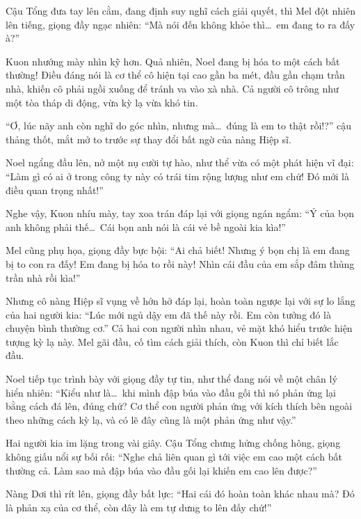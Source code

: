 \documentclass[../main.tex]{subfiles}
\begin{document}
Cậu Tổng đưa tay lên cằm, đang định suy nghĩ cách giải quyết, thì Mel đột nhiên lên tiếng, giọng đầy ngạc nhiên: ``Mà nói đến không khỏe thì\dots\ em đang to ra đấy à?''

Kuon nhướng mày nhìn kỹ hơn. Quả nhiên, Noel đang bị hóa to một cách bất thường! Điều đáng nói là cơ thể cô hiện tại cao gần ba mét, đầu gần chạm trần nhà, khiến cô phải ngồi xuống để tránh va vào xà nhà. Cả người cô trông như một tòa tháp di động, vừa kỳ lạ vừa khó tin.


``Ơ, lúc nãy anh còn nghĩ do góc nhìn, nhưng mà\dots\ đúng là em to thật rồi!?'' cậu thảng thốt, mắt mở to trước sự thay đổi bất ngờ của nàng Hiệp sĩ.

Noel ngẩng đầu lên, nở một nụ cười tự hào, như thể vừa có một phát hiện vĩ đại: ``Làm gì có ai ở trong công ty này có trái tim rộng lượng như em chứ! Đó mới là điều quan trọng nhất!''

Nghe vậy, Kuon nhíu mày, tay xoa trán đáp lại với giọng ngán ngẩm: ``Ý của bọn anh không phải thế\dots\ Cái bọn anh nói là cái vẻ bề ngoài kia kìa!''

Mel cũng phụ họa, giọng đầy bực bội: ``Ai chả biết! Nhưng ý bọn chị là em đang bị to con ra đấy! Em đang bị hóa to rồi này! Nhìn cái đầu của em sắp đâm thủng trần nhà rồi kìa!''

Nhưng cô nàng Hiệp sĩ vụng về hớn hở đáp lại, hoàn toàn ngược lại với sự lo lắng của hai người kia: ``Lúc mới ngủ dậy em đã thế này rồi. Em còn tưởng đó là chuyện bình thường cơ.'' Cả hai con người nhìn nhau, vẻ mặt khó hiểu trước hiện tượng kỳ lạ này. Mel gãi đầu, cố tìm cách giải thích, còn Kuon thì chỉ biết lắc đầu.

Noel tiếp tục trình bày với giọng đầy tự tin, như thể đang nói về một chân lý hiển nhiên: ``Kiểu như là\dots\ khi mình đập búa vào đầu gối thì nó phản ứng lại bằng cách đá lên, đúng chứ? Cơ thể con người phản ứng với kích thích bên ngoài theo những cách kỳ lạ, và có lẽ đây cũng là một phản ứng như vậy.''


Hai người kia im lặng trong vài giây. Cậu Tổng chưng hửng chống hông, giọng không giấu nổi sự bối rối: ``Nghe chả liên quan gì tới việc em cao một cách bất thường cả. Làm sao mà đập búa vào đầu gối lại khiến em cao lên được?''

Nàng Dơi thì rít lên, giọng đầy bất lực: ``Hai cái đó hoàn toàn khác nhau mà? Đó là phản xạ của cơ thể, còn đây là em tự dưng to lên đấy chứ!''
\end{document}
